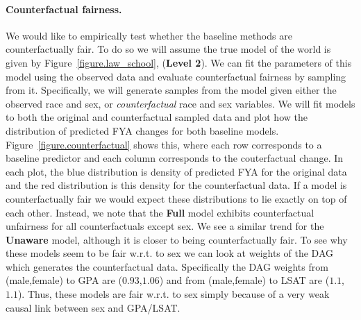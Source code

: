 \paragraph{Counterfactual fairness.}
We would like to empirically test whether the baseline methods are counterfactually fair. To do so we will assume the true model of the world is given by Figure~\ref{figure.law_school}, (\textbf{Level 2}). We can fit the parameters of this model using the observed data and evaluate counterfactual fairness by sampling from it. Specifically, we will generate samples from the model given either the observed race and sex, or \emph{counterfactual} race and sex variables. We will fit models to both the original and counterfactual sampled data and plot how the distribution of predicted FYA changes for both baseline models. Figure~\ref{figure.counterfactual} shows this, where each row corresponds to a baseline predictor and each column corresponds to the couterfactual change. In each plot, the blue distribution is density of predicted FYA for the original data and the red distribution is this density for the counterfactual data. If a model is counterfactually fair we would expect these distributions to lie exactly on top of each other. Instead, we note that the \textbf{Full} model exhibits counterfactual unfairness for all counterfactuals except sex. We see a similar trend for the \textbf{Unaware} model, although it is closer to being counterfactually fair. To see why these models seem to be fair w.r.t. to sex we can look at weights of the DAG which generates the counterfactual data. Specifically the DAG weights from (male,female) to GPA are ($0.93$,$1.06$) and from (male,female) to LSAT are ($1.1$,$1.1$). Thus, these models are fair w.r.t. to sex simply
because of a very weak causal link between sex and GPA/LSAT.


 






